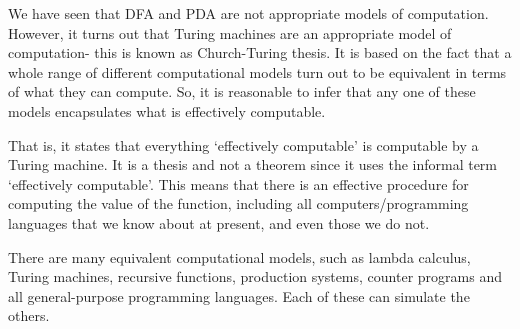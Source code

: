 \documentclass[a4paper, openany]{memoir}
\begin{document}
We have seen that DFA and PDA are not appropriate models of computation. However, it turns out that Turing machines are an appropriate model of computation- this is known as Church-Turing thesis. It is based on the fact that a whole range of different computational models turn out to be equivalent in terms of what they can compute. So, it is reasonable to infer that any one of these models encapsulates what is effectively computable. 

That is, it states that everything `effectively computable' is computable by a Turing machine. It is a thesis and not a theorem since it uses the informal term `effectively computable'. This means that there is an effective procedure for computing the value of the function, including all computers/programming languages that we know about at present, and even those we do not.

There are many equivalent computational models, such as lambda calculus, Turing machines, recursive functions, production systems, counter programs and all general-purpose programming languages. Each of these can simulate the others.
\end{document}
